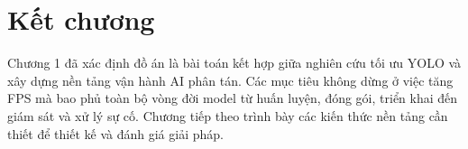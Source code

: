 \section{Kết chương}

Chương 1 đã xác định đồ án là bài toán kết hợp giữa nghiên cứu tối ưu YOLO và
xây dựng nền tảng vận hành AI phân tán. Các mục tiêu không dừng ở việc tăng FPS
mà bao phủ toàn bộ vòng đời model từ huấn luyện, đóng gói, triển khai đến giám
sát và xử lý sự cố. Chương tiếp theo trình bày các kiến thức nền tảng cần thiết để
thiết kế và đánh giá giải pháp.